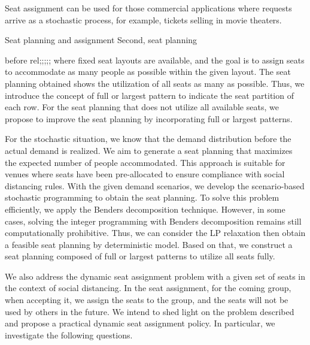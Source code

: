 Seat assignment can be used for those  commercial applications where requests arrive as a stochastic process, for example, tickets selling in movie theaters.

Seat planning and assignment Second, seat planning 

before rel;;;;;
where fixed seat layouts are available, and the goal is to assign seats to accommodate as many people as possible within the given layout. The seat planning obtained shows the utilization of all seats as many as possible. Thus, we introduce the concept of full or largest pattern to indicate the seat partition of each row. For the seat planning that does not utilize all available seats, we propose to improve the seat planning by incorporating full or largest patterns.


For the stochastic situation, we know that the demand distribution before the actual demand is realized. We aim to generate a seat planning that maximizes the expected number of people accommodated. This approach is suitable for venues where seats have been pre-allocated to ensure compliance with social distancing rules. With the given demand scenarios, we develop the scenario-based stochastic programming to obtain the seat planning. To solve this problem efficiently, we apply the Benders decomposition technique. However, in some cases, solving the integer programming with Benders decomposition remains still computationally prohibitive. Thus, we can consider the LP relaxation then obtain a feasible seat planning by deterministic model. Based on that, we construct a seat planning composed of full or largest patterns to utilize all seats fully.



We also address the dynamic seat assignment problem with a given set of seats in the context of social distancing. In the seat assignment, for the coming group, when accepting it, we assign the seats to the group, and the seats will not be used by others in the future. We intend to shed light on the problem described and propose a practical dynamic seat assignment policy. In particular, we investigate the following questions.

